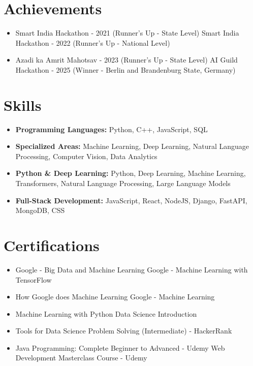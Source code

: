 \documentclass[a4paper,10pt]{article}
\begin{document}
\section*{Achievements}
\begin{itemize}
\item Smart India Hackathon - 2021 (Runner's Up - State Level) \hfill Smart India Hackathon - 2022 (Runner's Up - National Level)
\item Azadi ka Amrit Mahotsav - 2023 (Runner's Up - State Level) \hfill AI Guild Hackathon - 2025 (Winner - Berlin and Brandenburg State, Germany)
\end{itemize}

\section*{Skills}
\begin{itemize}
  \item \textbf{Programming Languages:} Python, C++, JavaScript, SQL
  \item \textbf{Specialized Areas:} Machine Learning, Deep Learning, Natural Language Processing, Computer Vision, Data Analytics
  \item \textbf{Python \& Deep Learning:} Python, Deep Learning, Machine Learning, Transformers, Natural Language Processing, Large Language Models
  \item \textbf{Full-Stack Development:} JavaScript, React, NodeJS, Django, FastAPI, MongoDB, CSS
\end{itemize}

\section*{Certifications}
\begin{itemize}
\item Google - Big Data and Machine Learning \hfill Google - Machine Learning with TensorFlow
\item How Google does Machine Learning \hfill Google - Machine Learning
\item Machine Learning with Python \hfill Data Science Introduction
\item Tools for Data Science \hfill Problem Solving (Intermediate) - HackerRank
\item Java Programming: Complete Beginner to Advanced - Udemy \hfill Web Development Masterclass Course - Udemy
\end{itemize}
\end{document}
